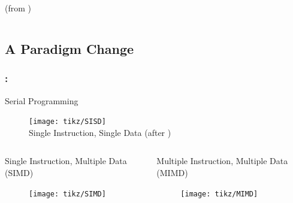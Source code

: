 \documentclass[9pt,xcolor=table]{beamer}
\begin{document}
\begin{frame}
\begin{columns}[c]
\begin{column}{.575\textwidth}
\begin{center}
        (from \cite{Sutter})
      \end{center}
    \end{column}
  \end{columns}
\end{frame}

\subsection{A Paradigm Change}
\begin{frame}
\frametitle{\insertsectionhead{}: \insertsubsectionhead{}}
\vfill
\begin{alertblock}{Serial Programming}
  \begin{figure}[htb]
    \texttt{[image: tikz/SISD]}\\[2pt]
    Single Instruction, Single Data (after \cite{Flynn})
  \end{figure}
\end{alertblock}
\vfill
\pause
\begin{columns}[c]
  \begin{column}{.47\textwidth}
    \begin{exampleblock}{Single Instruction, Multiple Data (SIMD)}
      \begin{figure}[htb]
        \texttt{[image: tikz/SIMD]}
      \end{figure}
    \end{exampleblock}
  \end{column}
  \begin{column}{.47\textwidth}
      \begin{exampleblock}{Multiple Instruction, Multiple Data (MIMD)}
      \begin{figure}[htb]
        \texttt{[image: tikz/MIMD]}
      \end{figure}
    \end{exampleblock}
    \end{column}
  \end{columns}
\vfill
\end{frame}
\end{document}
